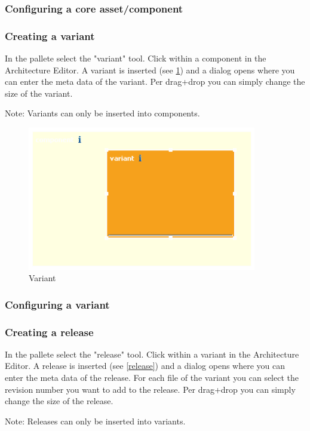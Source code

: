 \subsubsection{Configuring a core asset/component}


\subsubsection{Creating a variant}

In the pallete select the "variant" tool. Click within a component in 
the Architecture Editor. A variant is inserted (see \ref{variant}) and a dialog opens where you can enter the meta data of
the variant. Per drag+drop you can simply change the size of the variant. \par
Note: Variants can only be inserted into components.

\begin{figure}[h!]
\begin{center}
\includegraphics[width=10cm]{variant.png}
   \caption{Variant}
\label{variant}
\end{center}
\end{figure}\par


\subsubsection{Configuring a variant}


\subsubsection{Creating a release}

In the pallete select the "release" tool. Click within a variant in 
the Architecture Editor. A release is inserted (see \ref{release}) and a dialog opens where you can enter the meta data of
the release. For each file of the variant you can select the revision number you want to add to the release. 
Per drag+drop you can simply change the size of the release. \par
Note: Releases can only be inserted into variants.

